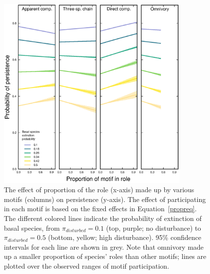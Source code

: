 \documentclass[12pt]{article}
\begin{document}
\begin{spacing}{2.0}
    
        \begin{figure}[hb!]
        \centering
        \includegraphics[width=0.85\textwidth]{figures/persistence_motif_participation.eps}
        \caption{The effect of proportion of the role (x-axis) made up by various motifs (columns) on persistence (y-axis). The effect of participating in each motif is based on the fixed effects in Equation~\ref{propreq}. The different colored lines indicate the probability of extinction of basal species, from $\pi_{disturbed} = 0.1$ (top, purple; no disturbance) to $\pi_{disturbed} = 0.5$ (bottom, yellow; high disturbance). 95\% confidence intervals for each line are shown in grey. Note that omnivory made up a smaller proportion of species' roles than other motifs; lines are plotted over the observed ranges of motif participation.}
    \label{fig:prop_lmer_all}
    \end{figure}
        

\end{spacing}
\end{document}
